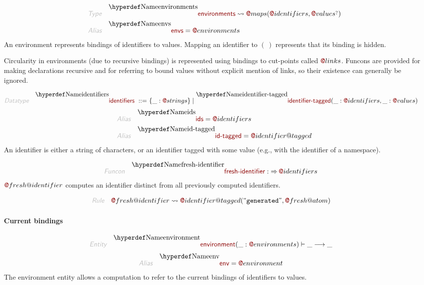 \begin{align*}
  \KEY{Type} \quad 
  & \FUNDEC{environments}  
    \leadsto \FUN@maps
               (  \FUN@identifiers, 
                      \FUN@values\QUERY )
\\
  \KEY{Alias} \quad
  & \FUNDEC{envs} = \FUN@environments
\end{align*}
An environment represents bindings of identifiers to values.
  Mapping an identifier to $(   \  )$ represents that its binding is hidden.

Circularity in environments (due to recursive bindings) is represented using
  bindings to cut-points called $\FUN@links$. Funcons are provided for making
  declarations recursive and for referring to bound values without explicit
  mention of links, so their existence can generally be ignored.

\begin{align*}
  \KEY{Datatype} \quad 
  \FUNDEC{identifiers} 
  \ ::= \ &
  \{ \_ : \FUN@strings \} \mid \FUNDEC{identifier-tagged}(
                   \_ : \FUN@identifiers, \_ : \FUN@values)
\end{align*}
\begin{align*}
  \KEY{Alias} \quad
  & \FUNDEC{ids} = \FUN@identifiers
\\
  \KEY{Alias} \quad
  & \FUNDEC{id-tagged} = \FUN@identifier@tagged
\end{align*}
An identifier is either a string of characters, or an identifier tagged with
  some value (e.g., with the identifier of a namespace).

\begin{align*}
  \KEY{Funcon} \quad
  & \FUNDEC{fresh-identifier} 
    :  \TO \FUN@identifiers 
\end{align*}
$\FUN@fresh@identifier$ computes an identifier distinct from all previously
  computed identifiers.

\begin{align*}
  \KEY{Rule} \quad
    & \FUN@fresh@identifier \leadsto 
        \FUN@identifier@tagged
          (  \STRING{generated}, 
                 \FUN@fresh@atom )
\end{align*}
\paragraph{Current bindings}\hypertarget{current-bindings}{}\label{current-bindings}

\begin{align*}
  \KEY{Entity} \quad
  & \FUNDEC{environment}(\_ : \FUN@environments) \vdash \_ \TRANS  \_
\end{align*}
\begin{align*}
  \KEY{Alias} \quad
  & \FUNDEC{env} = \FUN@environment
\end{align*}
The environment entity allows a computation to refer to the current bindings
  of identifiers to values.

